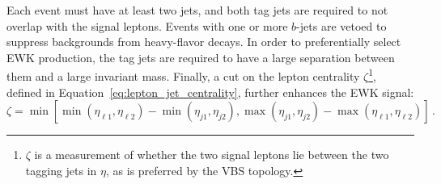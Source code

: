 Each event must have at least two jets, and both tag jets are required to not overlap with the signal leptons.
Events with one or more $b$-jets are vetoed to suppress backgrounds from heavy-flavor decays.
In order to preferentially select EWK production, the tag jets are required to have a large separation between them and a large invariant mass.
Finally, a cut on the lepton centrality $\zeta$\footnote{$\zeta$ is a measurement of whether the two signal leptons lie between the two tagging jets in $\eta$, as is preferred by the VBS topology.}, defined in Equation~\ref{eq:lepton_jet_centrality}, further enhances the EWK \ssww signal: %
\begin{equation}
\zeta = \min [\min (\eta_{\ell1}, \eta_{\ell2} )-\min(\eta_{j1},\eta_{j2}), \max(\eta_{j1},\eta_{j2})-\max(\eta_{\ell1},\eta_{\ell2}) ]\,.
\label{eq:lepton_jet_centrality}
\end{equation}
